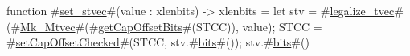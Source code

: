 function #\hyperref[sailRISCVzsetzystvec]{set\_stvec}#(value : xlenbits) -> xlenbits = {
  let stv = #\hyperref[sailRISCVzlegalizzezytvec]{legalize\_tvec}#(#\hyperref[sailRISCVzMkzyMtvec]{Mk\_Mtvec}#(#\hyperref[sailRISCVzgetCapOffsetBits]{getCapOffsetBits}#(STCC)), value);
  STCC = #\hyperref[sailRISCVzsetCapOffsetChecked]{setCapOffsetChecked}#(STCC, stv.#\hyperref[sailRISCVzbits]{bits}#());
  stv.#\hyperref[sailRISCVzbits]{bits}#()
}
